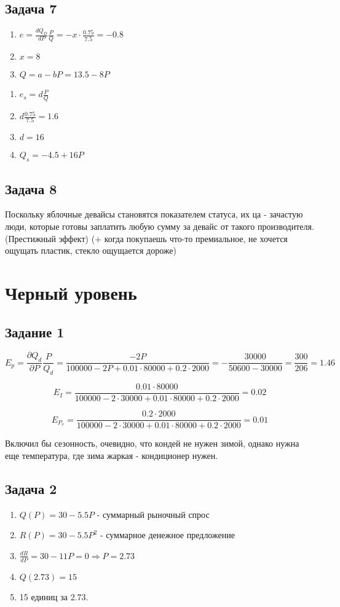 \documentclass[a4paper,12pt]{article}
\begin{document}
\subsection{Задача 7}
\begin{enumerate}
    \item $e = \frac{dQ_D}{dP}\frac{P}{Q} = -x\cdot \frac{0.75}{7.5}=-0.8$
    \item $x = 8$
    \item $Q=a-bP = 13.5-8P$
\end{enumerate}

\begin{enumerate}
    \item $e_s = d\frac{P}{Q}$
    \item $d\frac{0.75}{7.5} = 1.6$
    \item $d=16$
    \item $Q_s = -4.5+16P$
\end{enumerate}

\subsection{Задача 8}
Поскольку яблочные девайсы становятся показателем статуса, их ца - зачастую люди, которые готовы заплатить любую сумму за девайс от такого производителя. (Престижный эффект) (+ когда покупаешь что-то премиальное, не хочется ощущать пластик, стекло ощущается дороже)
\section{Черный уровень}

\subsection{Задание 1}

\[
E_p = \frac{\partial Q_d}{\partial P} \frac{P}{Q_d} = \frac{-2P}{100000-2P+0.01\cdot 80000+0.2\cdot 2000} = -\frac{30000}{50600-30000} = \frac{300}{206} = 1.46
\]

\[
E_I = \frac{0.01\cdot 80000}{100000-2\cdot 30000+0.01\cdot 80000+0.2\cdot 2000} = 0.02
\]

\[
E_{P_v} = \frac{0.2\cdot 2000}{100000-2\cdot 30000+0.01\cdot 80000+0.2\cdot 2000} = 0.01
\]

Включил бы сезонность, очевидно, что кондей не нужен зимой, однако нужна еще температура, где зима жаркая - кондиционер нужен. 

\subsection{Задача 2}
\begin{enumerate}
    \item $Q(P) = 30-5.5P$ - суммарный рыночный спрос
    \item $R(P) = 30-5.5P^2$ - суммарное денежное предложение
    \item $\frac{dR}{dP} = 30-11P=0 \Rightarrow P=2.73$
    \item $Q(2.73)=15$
    \item 15 единиц за 2.73.
\end{enumerate}
\end{document}

